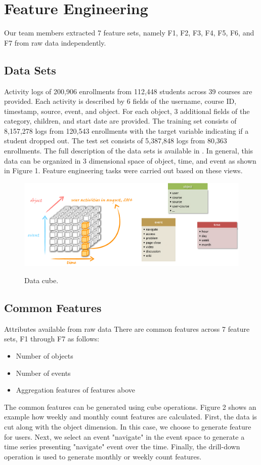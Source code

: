 \section{Feature Engineering}
Our team members extracted 7 feature sets, namely F1, F2, F3, F4, F5, F6, and F7 from raw data independently.

\subsection{Data Sets}
Activity logs of 200,906 enrollments from 112,448 students across 39 courses are provided.
Each activity is described by 6 fields of the username, course ID, timestamp, source, event, and object. 
For each object, 3 additional fields of the category, children, and start date are provided.
The training set consists of 8,157,278 logs from 120,543 enrollments with the target variable indicating if a student dropped out.  
The test set consists of 5,387,848 logs from 80,363 enrollments.
The full description of the data sets is available in \cite{kddcup2015_data}. In general, this data can be organized in 3 dimensional space of object, time, and event as shown in Figure 1. Feature engineering tasks were carried out based on these views.

\begin{figure}[!t]
	\centering
	\includegraphics[width=0.5 \textwidth]{cube}
	\label{fig:cube}
	\caption{Data cube.}
\end{figure}


\subsection{Common Features}
Attributes available from raw data
There are common features across 7 feature sets, F1 through F7 as follows:
\begin{itemize}
	\item Number of objects
	\item Number of events
	\item Aggregation features of features above
\end{itemize}

The common features can be generated using cube operations. Figure 2 shows an example how weekly and monthly count features are calculated. First, the data is cut along with the object dimension. In this case, we choose to generate feature for users. Next, we select an event "navigate" in the event space to generate a time series presenting "navigate" event over the time. Finally, the drill-down operation is used to generate monthly or weekly count features.

